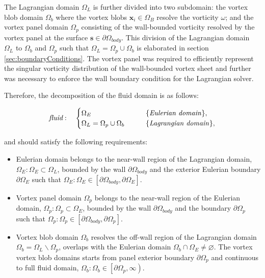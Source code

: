 The Lagrangian domain $\Omega_L$ is further divided into two subdomain: the vortex blob domain $\Omega_b$ where the vortex blobs $\mathbf{x}_i \in \Omega_B$ resolve the vorticity $\omega$; and the vortex panel domain $\Omega_p$ consisting of the wall-bounded vorticity resolved by the vortex panel at the surface $\mathbf{s} \in \partial \Omega_{body}$. This division of the Lagrangian domain $\Omega_L$ to $\Omega_b$ and $\Omega_p$ such that $\Omega_L = \Omega_p \cup \Omega_b$ is elaborated in section \ref{sec:boundaryConditions}. The vortex panel was required to efficiently represent the singular vorticity distribution of the wall-bounded vortex sheet and further was necessary to enforce the wall boundary condition for the Lagrangian solver.

Therefore, the decomposition of the fluid domain is as follows:

	\begin{equation}
	\textit{fluid}:\quad\begin{cases}
	\Omega_E &\qquad \text{\{\textit{Eulerian domain}\}}, \\
	\Omega_L = \Omega_p \cup \Omega_b &\qquad \text{\{\textit{Lagrangian domain}\}},
	  \end{cases}
	\end{equation}

and should satisfy the following requirements:
	\begin{itemize}
	\item Eulerian domain belongs to the near-wall region of the Lagrangian domain, $\Omega_E: \Omega_E \subset \Omega_L$, bounded by the wall $\partial \Omega_{body}$ and the exterior Eulerian boundary $\partial \Omega_E$ such that $\Omega_E: \Omega_E \in \left[\partial \Omega_{body}, \partial \Omega_E\right]$.
	\item Vortex panel domain $\Omega_p$ belongs to the near-wall region of the Eulerian domain, $\Omega_p: \Omega_p \subset \Omega_E$, bounded by the wall $\partial \Omega_{body}$ and the boundary $\partial \Omega_p$ such that $\Omega_p: \Omega_p \in \left[\partial \Omega_{body}, \partial \Omega_p\right]$.
	\item Vortex blob domain $\Omega_b$ resolves the off-wall region of the Lagrangian domain $\Omega_b = \Omega_L \backslash \Omega_p$, overlaps with the Eulerian domain $\Omega_b \cap \Omega_E \neq \varnothing$. The vortex vortex blob domains starts from panel exterior boundary $\partial \Omega_p$ and continuous to full fluid domain, $\Omega_b: \Omega_b \in \left[\partial\Omega_p,\infty\right)$.
	\end{itemize}

